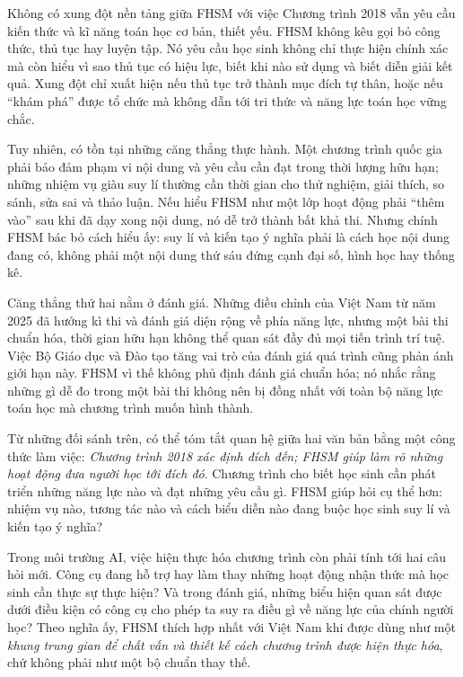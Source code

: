 Không có xung đột nền tảng giữa FHSM với việc Chương trình 2018 vẫn yêu cầu kiến thức và kĩ năng toán học cơ bản, thiết yếu. FHSM không kêu gọi bỏ công thức, thủ tục hay luyện tập. Nó yêu cầu học sinh không chỉ thực hiện chính xác mà còn hiểu vì sao thủ tục có hiệu lực, biết khi nào sử dụng và biết diễn giải kết quả. Xung đột chỉ xuất hiện nếu thủ tục trở thành mục đích tự thân, hoặc nếu ``khám phá'' được tổ chức mà không dẫn tới tri thức và năng lực toán học vững chắc.

Tuy nhiên, có tồn tại những căng thẳng thực hành. Một chương trình quốc gia phải bảo đảm phạm vi nội dung và yêu cầu cần đạt trong thời lượng hữu hạn; những nhiệm vụ giàu suy lí thường cần thời gian cho thử nghiệm, giải thích, so sánh, sửa sai và thảo luận. Nếu hiểu FHSM như một lớp hoạt động phải ``thêm vào'' sau khi đã dạy xong nội dung, nó dễ trở thành bất khả thi. Nhưng chính FHSM bác bỏ cách hiểu ấy: suy lí và kiến tạo ý nghĩa phải là cách học nội dung đang có, không phải một nội dung thứ sáu đứng cạnh đại số, hình học hay thống kê.

Căng thẳng thứ hai nằm ở đánh giá. Những điều chỉnh của Việt Nam từ năm 2025 đã hướng kì thi và đánh giá diện rộng về phía năng lực, nhưng một bài thi chuẩn hóa, thời gian hữu hạn không thể quan sát đầy đủ mọi tiến trình trí tuệ. Việc Bộ Giáo dục và Đào tạo tăng vai trò của đánh giá quá trình cũng phản ánh giới hạn này. FHSM vì thế không phủ định đánh giá chuẩn hóa; nó nhắc rằng những gì dễ đo trong một bài thi không nên bị đồng nhất với toàn bộ năng lực toán học mà chương trình muốn hình thành.

Từ những đối sánh trên, có thể tóm tắt quan hệ giữa hai văn bản bằng một công thức làm việc: \emph{Chương trình 2018 xác định đích đến; FHSM giúp làm rõ những hoạt động đưa người học tới đích đó}. Chương trình cho biết học sinh cần phát triển những năng lực nào và đạt những yêu cầu gì. FHSM giúp hỏi cụ thể hơn: nhiệm vụ nào, tương tác nào và cách biểu diễn nào đang buộc học sinh suy lí và kiến tạo ý nghĩa?

Trong môi trường AI, việc hiện thực hóa chương trình còn phải tính tới hai câu hỏi mới. Công cụ đang hỗ trợ hay làm thay những hoạt động nhận thức mà học sinh cần thực sự thực hiện? Và trong đánh giá, những biểu hiện quan sát được dưới điều kiện có công cụ cho phép ta suy ra điều gì về năng lực của chính người học? Theo nghĩa ấy, FHSM thích hợp nhất với Việt Nam khi được dùng như một \emph{khung trung gian để chất vấn và thiết kế cách chương trình được hiện thực hóa}, chứ không phải như một bộ chuẩn thay thế.

